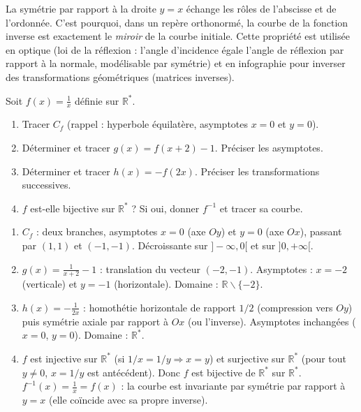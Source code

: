 \documentclass[11pt]{article}
\def\setminus{\mathbin{\backslash}}\let\smallsetminus\setminus
\begin{document}
\begin{savaistu}
La symétrie par rapport à la droite $y=x$ échange les rôles de l'abscisse et de l'ordonnée. C'est pourquoi, dans un repère orthonormé, la courbe de la fonction inverse est exactement le \emph{miroir} de la courbe initiale. Cette propriété est utilisée en optique (loi de la réflexion : l'angle d'incidence égale l'angle de réflexion par rapport à la normale, modélisable par symétrie) et en infographie pour inverser des transformations géométriques (matrices inverses).
\end{savaistu}

\begin{exercice}[Entraînement]
Soit $f(x)=\frac{1}{x}$ définie sur $\mathbb{R}^*$.
\begin{enumerate}
\item Tracer $C_f$ (rappel : hyperbole équilatère, asymptotes $x=0$ et $y=0$).
\item Déterminer et tracer $g(x)=f(x+2)-1$. Préciser les asymptotes.
\item Déterminer et tracer $h(x)=-f(2x)$. Préciser les transformations successives.
\item $f$ est-elle bijective sur $\mathbb{R}^*$ ? Si oui, donner $f^{-1}$ et tracer sa courbe.
\end{enumerate}
\end{exercice}

\begin{corrige}[Exercice n°1]
\begin{enumerate}
\item $C_f$ : deux branches, asymptotes $x=0$ (axe $Oy$) et $y=0$ (axe $Ox$), passant par $(1,1)$ et $(-1,-1)$. Décroissante sur $]-\infty,0[$ et sur $]0,+\infty[$.
\item $g(x)=\frac{1}{x+2}-1$ : translation du vecteur $(-2,-1)$. Asymptotes : $x=-2$ (verticale) et $y=-1$ (horizontale). Domaine : $\mathbb{R}\setminus\{-2\}$.
\item $h(x)=-\frac{1}{2x}$ : homothétie horizontale de rapport $1/2$ (compression vers $Oy$) puis symétrie axiale par rapport à $Ox$ (ou l'inverse). Asymptotes inchangées ($x=0$, $y=0$). Domaine : $\mathbb{R}^*$.
\item $f$ est injective sur $\mathbb{R}^*$ (si $1/x = 1/y \Rightarrow x=y$) et surjective sur $\mathbb{R}^*$ (pour tout $y\neq 0$, $x=1/y$ est antécédent). Donc $f$ est bijective de $\mathbb{R}^*$ sur $\mathbb{R}^*$. $f^{-1}(x)=\frac{1}{x}=f(x)$ : la courbe est invariante par symétrie par rapport à $y=x$ (elle coïncide avec sa propre inverse).
\end{enumerate}
\end{corrige}
\end{document}
